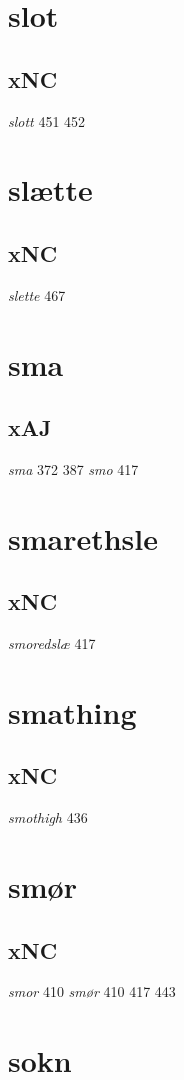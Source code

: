 \documentclass[a4paper,twocolumn]{article}
\begin{document}
\section{slot}
\label{sec:org633984e}
\subsection{xNC}
\label{sec:org96cae0a}
\emph{slott} 451 452 
\section{slætte}
\label{sec:org4c28aba}
\subsection{xNC}
\label{sec:org8cecb13}
\emph{slette} 467 
\section{sma}
\label{sec:org68a81d0}
\subsection{xAJ}
\label{sec:org97c27c0}
\emph{sma} 372 387 \emph{smo} 417 
\section{smarethsle}
\label{sec:org99d2599}
\subsection{xNC}
\label{sec:org16b8149}
\emph{smoredslæ} 417 
\section{smathing}
\label{sec:orga1beb93}
\subsection{xNC}
\label{sec:org8c69fd6}
\emph{smothigh} 436 
\section{smør}
\label{sec:org86bbe25}
\subsection{xNC}
\label{sec:org2627928}
\emph{smor} 410 \emph{smør} 410 417 443 
\section{sokn}
\label{sec:org9d2c6b6}
\end{document}
